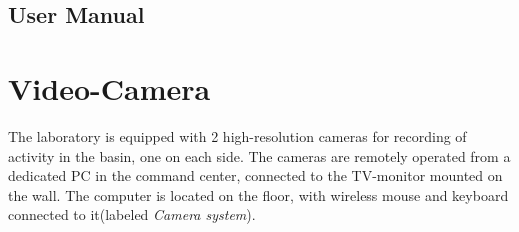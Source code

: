 \documentclass[a4paper,english]{report}
\begin{document}
\subsection{User Manual}
\clearpage{}
\section{Video-Camera}
The laboratory is equipped with 2 high-resolution cameras for recording of activity in the basin, one on each side. The cameras are remotely operated from a dedicated PC in the command center, connected to the TV-monitor mounted on the wall. The computer is located on the floor, with wireless mouse and keyboard connected to it(labeled \textit{Camera system}). 

\clearpage


\end{document}
